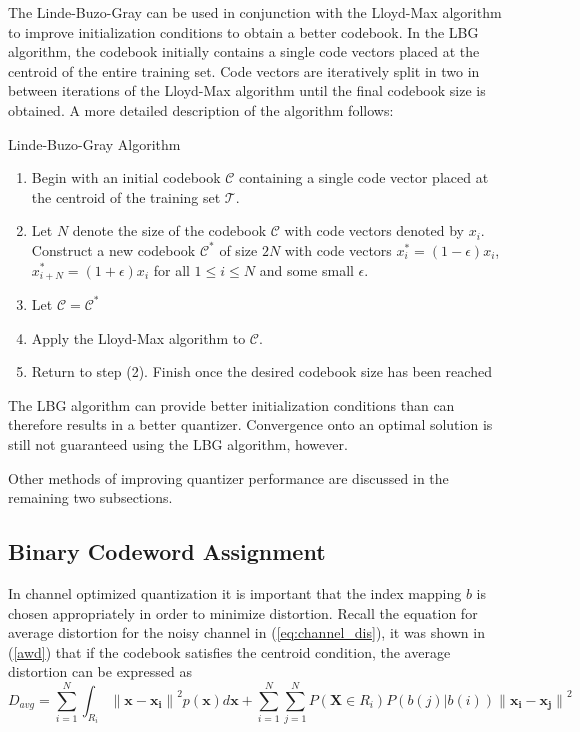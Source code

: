 \documentclass[10pt]{article}
\begin{document}
The Linde-Buzo-Gray can be used in conjunction with the Lloyd-Max algorithm to improve initialization conditions to obtain a better codebook. In the LBG algorithm, the codebook initially contains a single code vectors placed at the centroid of the entire training set. Code vectors are iteratively split in two in between iterations of the Lloyd-Max algorithm until the final codebook size is obtained. A more detailed description of the algorithm follows:

\medskip

{\sc \noindent Linde-Buzo-Gray Algorithm}
\begin{enumerate}
\item Begin with an initial codebook $\mathcal{C}$ containing a single code vector placed at the centroid of the training set $\mathcal{T}$.
\item Let $N$ denote the size of the codebook $\mathcal{C}$ with code vectors denoted by $x_i$. Construct a new codebook $\mathcal{C}^*$ of size $2N$ with code vectors $x_i^* = (1-\epsilon)x_i$, $x_{i+N}^* = (1+\epsilon)x_i$ for all $1 \le i \le N$ and some small $\epsilon$.
\item Let $\mathcal{C}=\mathcal{C}^*$
\item Apply the Lloyd-Max algorithm to $\mathcal{C}$.
\item Return to step (2). Finish once the desired codebook size has been reached
\end{enumerate}

The LBG algorithm can provide better initialization conditions than can therefore results in a better quantizer. Convergence onto an optimal solution is still not guaranteed using the LBG algorithm, however.

Other methods of improving quantizer performance are discussed in the remaining two subsections.

\subsection{Binary Codeword Assignment}
\label{sec:code_assign}
In channel optimized quantization it is important that the index mapping $b$ is chosen appropriately in order to minimize distortion. Recall the equation for average distortion for the noisy channel in (\ref{eq:channel_dis}), it was shown in (\ref{awd}) that if the codebook satisfies the centroid condition, the average distortion can be expressed as
\begin{equation}
\label{eq:codeword_distortion}
D_{avg}  = \sum_{i=1}^N \int_{R_i} {\|\mathbf{x} - \mathbf{x_i}\|}^2p(\mathbf{x})d\mathbf{x} + \sum_{i=1}^N \sum_{j=1}^N P(\mathbf{X} \in R_i) P(b(j)|b(i)) {\|\mathbf{x_i} - \mathbf{x_j}\|}^2
\end{equation}
\end{document}
